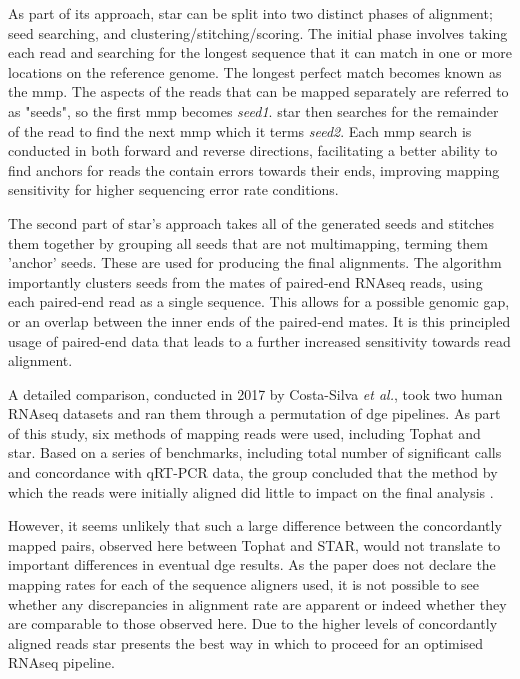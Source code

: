 As part of its approach, \acrshort{star} can be split into two distinct phases of alignment; seed searching, and clustering/stitching/scoring. The initial phase involves taking each read and searching for the longest sequence that it can match in one or more locations on the reference genome. The longest perfect match becomes known as the \acrfull{mmp}. The aspects of the reads that can be mapped separately are referred to as "seeds", so the first \acrfull{mmp} becomes \textit{seed1}. \acrshort{star} then searches for the remainder of the read to find the next \acrshort{mmp} which it terms \textit{seed2}. Each \acrshort{mmp} search is conducted in both forward and reverse directions, facilitating a better ability to find anchors for reads the contain errors towards their ends, improving mapping sensitivity for higher sequencing error rate conditions. 

The second part of \acrshort{star}'s approach takes all of the generated seeds and stitches them together by grouping all seeds that are not multimapping, terming them 'anchor' seeds. These are used for producing the final alignments. The algorithm importantly clusters seeds from the mates of paired-end RNAseq reads, using each paired-end read as a single sequence. This allows for a possible genomic gap, or an overlap between the inner ends of the paired-end mates. It is this principled usage of paired-end data that leads to a further increased sensitivity towards read alignment.  

A detailed comparison, conducted in 2017 by Costa-Silva \textit{et al.}, took two human RNAseq datasets and ran them through a permutation of \acrshort{dge} pipelines. As part of this study, six methods of mapping reads were used, including Tophat and \acrshort{star}. Based on a series of benchmarks, including total number of significant calls and concordance with qRT-PCR data, the group concluded that the method by which the reads were initially aligned did little to impact on the final analysis \cite{10.1371/journal.pone.0190152}. 

However, it seems unlikely that such a large difference between the concordantly mapped pairs, observed here between Tophat and STAR, would not translate to important differences in eventual \acrshort{dge} results. As the paper does not declare the mapping rates for each of the sequence aligners used, it is not possible to see whether any discrepancies in alignment rate are apparent or indeed whether they are comparable to those observed here. Due to the higher levels of concordantly aligned reads \acrshort{star} presents the best way in which to proceed for an optimised RNAseq pipeline. 

